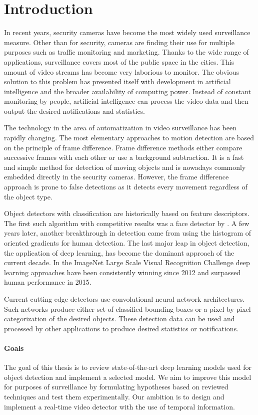 \chapter*{Introduction}
In recent years, security cameras have become the most widely used surveillance measure. Other than for security, cameras are finding their use for multiple purposes such as traffic monitoring and marketing. Thanks to the wide range of applications, surveillance covers most of the public space in the cities. This amount of video streams has become very laborious to monitor. The obvious solution to this problem has presented itself with development in artificial intelligence and the broader availability of computing power. Instead of constant monitoring by people, artificial intelligence can process the video data and then output the desired notifications and statistics.

The technology in the area of automatization in video surveillance has been rapidly changing. The most elementary approaches to motion detection are based on the principle of frame difference. Frame difference methods either compare successive frames with each other or use a background subtraction. It is a fast and simple method for detection of moving objects and is nowadays commonly embedded directly in the security cameras. However, the frame difference approach is prone to false detections as it detects every movement regardless of the object type.

Object detectors with classification are historically based on feature descriptors. The first such algorithm with competitive results was a face detector by \citeauthor{bib:viola}. A few years later, another breakthrough in detection came from \citeauthor{bib:hog} using the histogram of oriented gradients for human detection. The last major leap in object detection, the application of deep learning, has become the dominant approach of the current decade. In the ImageNet Large Scale Visual Recognition Challenge deep learning approaches have been consistently winning since 2012 and surpassed human performance in 2015.

Current cutting edge detectors use convolutional neural network architectures. Such networks produce either set of classified bounding boxes or a pixel by pixel categorization of the desired objects. These detection data can be used and processed by other applications to produce desired statistics or notifications.

\subsubsection{Goals}
The goal of this thesis is to review state-of-the-art deep learning models used for object detection and implement a selected model. We aim to improve this model for purposes of surveillance by formulating hypotheses based on reviewed techniques and test them experimentally. Our ambition is to design and implement a real-time video detector with the use of temporal information.

